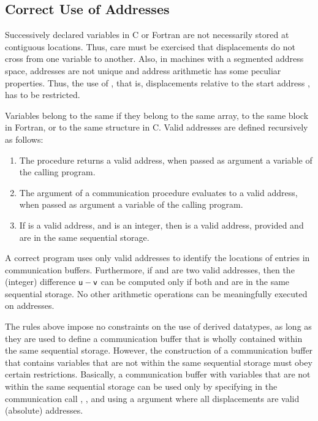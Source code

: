 \subsection{Correct Use of Addresses}
\label{subsec:pt2pt-segmented}

Successively declared variables in C or Fortran are not necessarily
stored at contiguous locations.  Thus, care must be exercised
that displacements do not cross from one variable
to another.  Also, in machines with a segmented address space,
addresses are not unique and address arithmetic has some peculiar
properties.   Thus, the use of ,
that is, displacements relative to the
start address , has to be restricted.

Variables belong
to the same  if they belong to the same
array,
to the same  block in Fortran, or to the same structure in C.
Valid addresses are defined recursively as follows:

\begin{enumerate}
\item
The procedure
returns a valid address, when
passed as argument a variable of the calling program.
\item
The  argument of a communication procedure evaluates to a
valid address, when passed as argument a variable of the calling program.
\item
If  is a valid address, and  is an
integer, then  is a valid address, provided  and
 are in the same sequential storage.
\end{enumerate}

A correct program uses only valid addresses to identify the
locations of entries in communication buffers.
Furthermore, if  and  are two valid addresses, then
the (integer)
difference $\mpiarg{u}-\mpiarg{v}$ can be computed only if both  and 
are in the same sequential storage.
No other arithmetic operations can be meaningfully executed on addresses.

The rules above impose no constraints on the use of derived
datatypes, as long as they are used to define a communication buffer
that is wholly contained within the same sequential storage.
However, the construction of a communication buffer that contains
variables that are not within the same sequential storage must obey
certain restrictions.  Basically, a communication buffer with
variables that are not within the same sequential storage can be used
only by specifying in the communication call \mpicode{ = }%
, , and using a 
argument where all displacements are valid (absolute) addresses.

